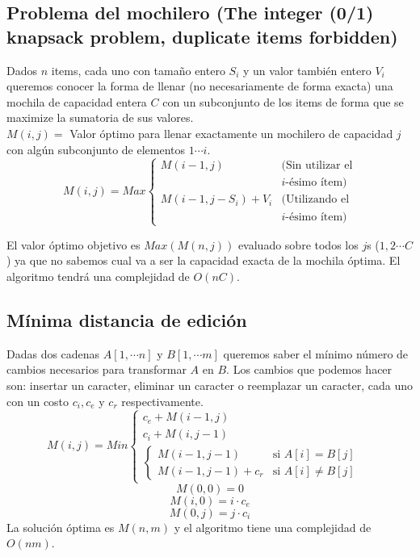 \begin{multicols}{2}
\subsection{Problema del mochilero (The integer (0/1) knapsack problem, duplicate items forbidden)}
Dados $n$ items, cada uno con tama\~no entero $S_i$ y un valor tambi\'en entero $V_i$ queremos conocer la forma de llenar (no necesariamente de forma exacta) una mochila de capacidad entera $C$ con un subconjunto de los items de forma que se maximize la sumatoria de sus valores.\\

$M(i,j)=$ Valor \'optimo para llenar exactamente un mochilero de capacidad $j$ con alg\'un subconjunto de elementos $1\cdots i$.
\[
	M(i,j)=Max\left \{ \begin{array}{ll}
		M(i-1,j) & (\mbox{Sin utilizar el}\\ & \mbox{$i$-\'esimo \'item})\\
		M(i-1,j-S_i)+V_i & (\mbox{Utilizando el}\\ & \mbox{$i$-\'esimo \'item})\end{array}\right.
\]

El valor \'optimo objetivo es $Max(M(n,j))$ evaluado sobre todos los $j$s ($1,2\cdots C$) ya que no sabemos cual va a ser la capacidad exacta de la mochila \'optima. El algoritmo tendr\'a una complejidad de $O(nC)$.

\subsection{M\'inima distancia de edici\'on}
Dadas dos cadenas  $A[1,\cdots n]$ y $B[1,\cdots m]$ queremos saber el m\'inimo n\'umero de cambios necesarios para transformar $A$ en $B$. Los cambios que podemos hacer son: insertar un caracter, eliminar un caracter o reemplazar un caracter, cada uno con un costo $c_i,c_e$ y $c_r$ respectivamente.
\[
	M(i,j)= Min\left\{ \begin{array}{ll}
		c_e+M(i-1,j)& \\
		c_i+M(i,j-1)& \\
	\left\{ \begin{array}{ll}
		M(i-1,j-1)& \mbox{si $A[i]=B[j]$}\\
		M(i-1,j-1)+c_r& \mbox{si $A[i]\neq B[j]$} \end{array} \right. \end{array} \right.
\]
\[M(0,0)=0\]
\[M(i,0)=i\cdot c_e\]
\[M(0,j)=j\cdot c_i\]
La soluci\'on \'optima es $M(n,m)$ y el algoritmo tiene una complejidad de $O(nm)$.


\end{multicols}
